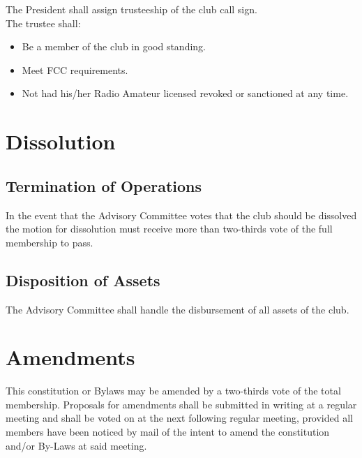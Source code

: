 \documentclass{report}
\begin{document}
\noindent The President shall assign trusteeship of the club call sign.\\

\noindent The trustee shall:
\begin{itemize}
\item Be a member of the club in good standing.

\item Meet FCC requirements.

\item Not had his/her Radio Amateur licensed revoked or sanctioned at any time.
\end{itemize}

\chapter{Dissolution}
\section{Termination of Operations}

In the event that the Advisory Committee votes that the club should be dissolved the motion for dissolution must receive more than two-thirds vote of the full membership to pass.

\section{Disposition of Assets}

The Advisory Committee shall handle the disbursement of all assets of the club.

\chapter{Amendments}
This constitution or Bylaws may be amended by a two-thirds vote of the total membership. Proposals for amendments shall be submitted in writing at a regular meeting and shall be voted on at the next following regular meeting, provided all members have been noticed by mail of the intent to amend the constitution and/or By-Laws at said meeting.
\end{document}
